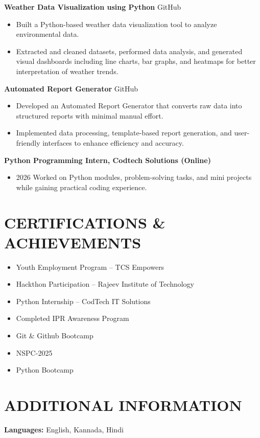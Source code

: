\documentclass[10pt,a4paper]{article}
\begin{document}
\noindent \textbf{Weather Data Visualization using Python} \hfill GitHub\vspace{2pt}\\
\begin{itemize}[leftmargin=*, parsep=0pt, itemsep=2pt, topsep=2pt]
    \item Built a Python-based weather data visualization tool to analyze environmental data.
    \item Extracted and cleaned datasets, performed data analysis, and generated visual dashboards including line charts, bar graphs, and heatmaps for better interpretation of weather trends.
\end{itemize}

\noindent \textbf{Automated Report Generator} \hfill GitHub\vspace{2pt}\\
\begin{itemize}[leftmargin=*, parsep=0pt, itemsep=2pt, topsep=2pt]
    \item Developed an Automated Report Generator that converts raw data into structured reports with minimal manual effort.
    \item Implemented data processing, template-based report generation, and user-friendly interfaces to enhance efficiency and accuracy.
\end{itemize}

\noindent \textbf{Python Programming Intern, Codtech Solutions (Online)}\vspace{2pt}\\
\begin{itemize}[leftmargin=*, parsep=0pt, itemsep=2pt, topsep=2pt]
    \item 2026 Worked on Python modules, problem-solving tasks, and mini projects while gaining practical coding experience.
\end{itemize}



\section*{CERTIFICATIONS \& ACHIEVEMENTS}

\begin{itemize}[leftmargin=*]
    \item Youth Employment Program – TCS Empowers
    \item Hackthon Participation – Rajeev Institute of Technology
    \item Python Internship – CodTech IT Solutions
    \item Completed IPR Awareness Program
    \item Git \& Github Bootcamp
    \item NSPC-2025
    \item Python Bootcamp
\end{itemize}



\section*{ADDITIONAL INFORMATION}

\textbf{Languages:} English, Kannada, Hindi
\end{document}
